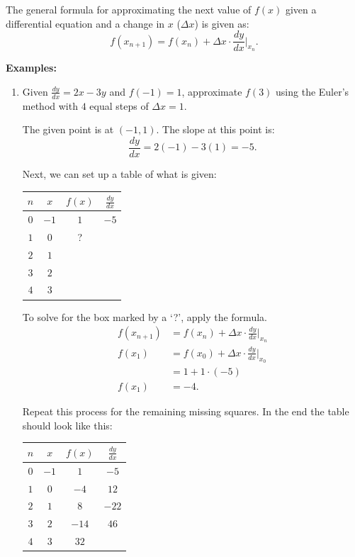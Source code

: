 \documentclass[12pt]{article}
\begin{document}
The general formula for approximating the next value of $f(x)$ given a differential equation and a change in $x$ ($\Delta x$) is given as:
\[ f(x_{n + 1}) = f(x_n) + \Delta x \cdot \frac{dy}{dx} \Big|_{x_n}. \]

\noindent \textbf{Examples:}
\begin{enumerate}
	\item Given $\frac{dy}{dx} = 2x - 3y$ and $f(-1) = 1$, approximate $f(3)$ using the Euler's method with $4$ equal steps of $\Delta x = 1$.

	The given point is at $(-1, 1)$. The slope at this point is:
	\[ \frac{dy}{dx} = 2(-1) - 3(1) = -5. \]

	Next, we can set up a table of what is given:
	\begin{table}[H]
		\centering
		\begin{tabular}{|c|c|c|c|}
			\hline
			$n$ & $x$ & $f(x)$ & $\frac{dy}{dx}$ \\
			\hline \hline
			$0$ & $-1$ & $1$ & $-5$ \\
			\hline
			$1$ & $0$ & ? & \\
			\hline
			$2$ & $1$ & & \\
			\hline
			$3$ & $2$ & & \\
			\hline
			$4$ & $3$ & & \\
			\hline
		\end{tabular}
	\end{table}

	To solve for the box marked by a `?', apply the formula.
	\begin{align*}
		f(x_{n + 1}) &= f(x_n) + \Delta x \cdot \frac{dy}{dx} \Big|_{x_n} \\[5pt]
		f(x_1) &= f(x_0) + \Delta x \cdot \frac{dy}{dx} \Big|_{x_0} \\[5pt]
		&= 1 + 1 \cdot (-5) \\
		f(x_1) &= -4.
	\end{align*}

	Repeat this process for the remaining missing squares. In the end the table should look like this:
	\begin{table}[H]
		\centering
		\begin{tabular}{|c|c|c|c|}
			\hline
			$n$ & $x$ & $f(x)$ & $\frac{dy}{dx}$ \\
			\hline \hline
			$0$ & $-1$ & $1$ & $-5$ \\
			\hline
			$1$ & $0$ & $-4$ & $12$ \\
			\hline
			$2$ & $1$ & $8$ & $-22$ \\
			\hline
			$3$ & $2$ & $-14$ & $46$ \\
			\hline
			$4$ & $3$ & $32$ & \\
			\hline
		\end{tabular}
	\end{table}


\end{enumerate}
\end{document}
